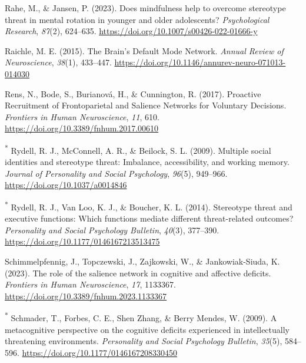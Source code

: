 \documentclass[
  stu, a4paper, 12pt,mask,floatsintext]{apa7}
\newlength{\cslhangindent}
\newenvironment{CSLReferences}[2] %
 {\begin{list}{}{%
  \setlength{\itemindent}{0pt}
  \setlength{\leftmargin}{0pt}
  \setlength{\parsep}{0pt}
  \ifodd #1
   \setlength{\leftmargin}{\cslhangindent}
   \setlength{\itemindent}{-1\cslhangindent}
  \fi
  \setlength{\itemsep}{#2\baselineskip}}}
 {\end{list}}
\begin{document}
\begin{CSLReferences}{1}{0}
Rahe, M., \& Jansen, P. (2023). Does mindfulness help to overcome stereotype threat in mental rotation in younger and older adolescents? \emph{Psychological Research}, \emph{87}(2), 624--635. \url{https://doi.org/10.1007/s00426-022-01666-y}

Raichle, M. E. (2015). The {Brain}'s {Default Mode Network}. \emph{Annual Review of Neuroscience}, \emph{38}(1), 433--447. \url{https://doi.org/10.1146/annurev-neuro-071013-014030}

Rens, N., Bode, S., Burianová, H., \& Cunnington, R. (2017). Proactive {Recruitment} of {Frontoparietal} and {Salience Networks} for {Voluntary Decisions}. \emph{Frontiers in Human Neuroscience}, \emph{11}, 610. \url{https://doi.org/10.3389/fnhum.2017.00610}

\textsuperscript{*} Rydell, R. J., McConnell, A. R., \& Beilock, S. L. (2009). Multiple social identities and stereotype threat: {Imbalance}, accessibility, and working memory. \emph{Journal of Personality and Social Psychology}, \emph{96}(5), 949--966. \url{https://doi.org/10.1037/a0014846}

\textsuperscript{*} Rydell, R. J., Van Loo, K. J., \& Boucher, K. L. (2014). Stereotype threat and executive functions: {Which} functions mediate different threat-related outcomes? \emph{Personality and Social Psychology Bulletin}, \emph{40}(3), 377--390. \url{https://doi.org/10.1177/0146167213513475}

Schimmelpfennig, J., Topczewski, J., Zajkowski, W., \& Jankowiak-Siuda, K. (2023). The role of the salience network in cognitive and affective deficits. \emph{Frontiers in Human Neuroscience}, \emph{17}, 1133367. \url{https://doi.org/10.3389/fnhum.2023.1133367}

\textsuperscript{*} Schmader, T., Forbes, C. E., Shen Zhang, \& Berry Mendes, W. (2009). A metacognitive perspective on the cognitive deficits experienced in intellectually threatening environments. \emph{Personality and Social Psychology Bulletin}, \emph{35}(5), 584--596. \url{https://doi.org/10.1177/0146167208330450}


\end{CSLReferences}
\end{document}
